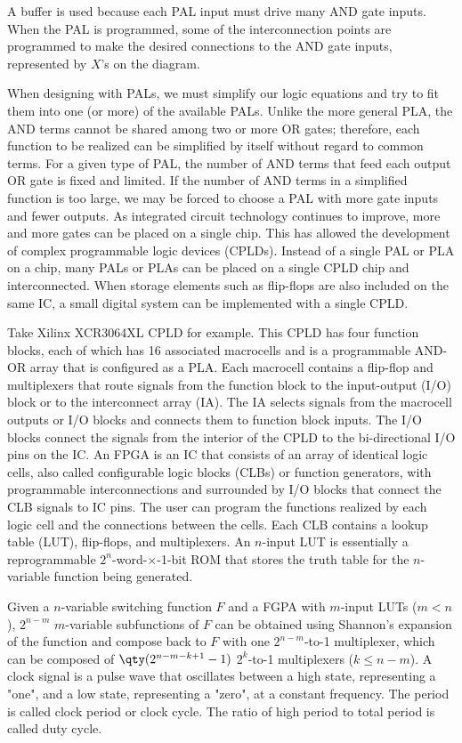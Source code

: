 \documentclass[a4paper,12pt]{report}
\begin{document}
A buffer is used because each PAL input must drive many AND gate inputs. When the PAL is programmed, some of the interconnection points are programmed to make the desired connections to the AND gate inputs, represented by $X$'s on the diagram.

When designing with PALs, we must simplify our logic equations and try to fit them into one (or more) of the available PALs. Unlike the more general PLA, the AND terms cannot be shared among two or more OR gates; therefore, each function to be realized can be simplified by itself without regard to common terms. For a given type of PAL, the number of AND terms that feed each output OR gate is fixed and limited. If the number of AND terms in a simplified function is too large, we may be forced to choose a PAL with more gate inputs and fewer outputs.
As integrated circuit technology continues to improve, more and more gates can be placed on a single chip. This has allowed the development of complex programmable logic devices (CPLDs). Instead of a single PAL or PLA on a chip, many PALs or PLAs can be placed on a single CPLD chip and interconnected. When storage elements such as flip-flops are also included on the same IC, a small digital system can be implemented with a single CPLD.

Take Xilinx XCR3064XL CPLD for example. This CPLD has four function blocks, each of which has 16 associated macrocells and is a programmable AND-OR array that is configured as a PLA. Each macrocell contains a flip-flop and multiplexers that route signals from the function block to the input-output (I/O) block or to the interconnect array (IA). The IA selects signals from the macrocell outputs or I/O blocks and connects them to function block inputs. The I/O blocks connect the signals from the interior of the CPLD to the bi-directional I/O pins on the IC.
An FPGA is an IC that consists of an array of identical logic cells, also called configurable logic blocks (CLBs) or function generators, with programmable interconnections and surrounded by I/O blocks that connect the CLB signals to IC pins. The user can program the functions realized by each logic cell and the connections between the cells. Each CLB contains a lookup table (LUT), flip-flops, and multiplexers. An $n$-input LUT is essentially a reprogrammable $2^n$-word-$\times$-1-bit ROM that stores the truth table for the $n$-variable function being generated.

Given a $n$-variable switching function $F$ and a FGPA with $m$-input LUTs ($m<n$), $2^{n-m}$ $m$-variable subfunctions of $F$ can be obtained using Shannon's expansion of the function and compose back to $F$ with one $2^{n-m}$-to-1 multiplexer, which can be composed of $\qty(2^{n-m-k+1}-1)$ $2^k$-to-1 multiplexers ($k\leq n-m$).
A clock signal is a pulse wave that oscillates between a high state, representing a "one", and a low state, representing a "zero", at a constant frequency. The period is called clock period or clock cycle. The ratio of high period to total period is called duty cycle.
\end{document}
